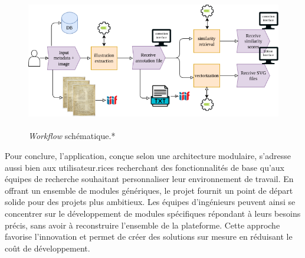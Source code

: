  \begin{figure}[H]
          \begin{center}
          \includegraphics[height=6cm]{figues/workflow.png}
          \end{center}
          \caption{\emph{Workflow} schématique.*}
          \label{fig:workflow} \end{figure}

Pour conclure, l'application, conçue selon une architecture modulaire,
s'adresse aussi bien aux utilisateur.rices recherchant des fonctionnalités de
base qu'aux équipes de recherche souhaitant personnaliser leur
environnement de travail. En offrant un ensemble de modules génériques,
le projet \aikon fournit un point de départ solide pour des projets plus
ambitieux. Les équipes d'ingénieurs peuvent ainsi se concentrer sur le
développement de modules spécifiques répondant à leurs besoins précis,
sans avoir à reconstruire l'ensemble de la plateforme. Cette approche
favorise l'innovation et permet de créer des solutions sur mesure en
réduisant le coût de développement.
